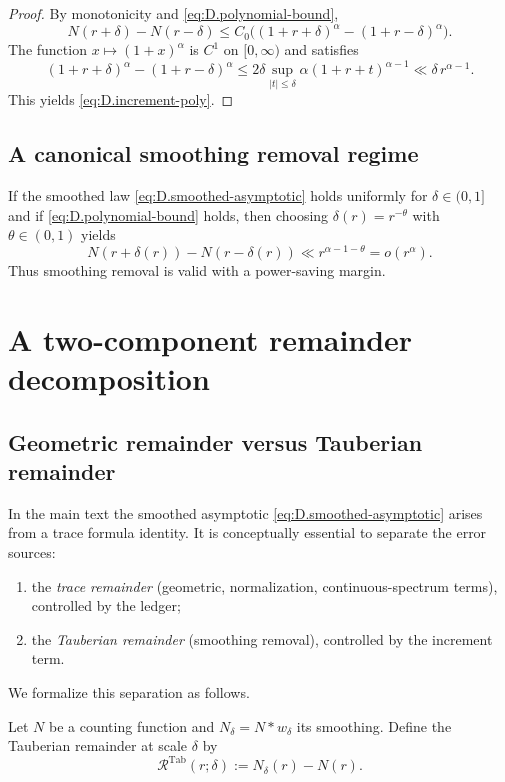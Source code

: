 \begin{proof}
By monotonicity and \eqref{eq:D.polynomial-bound},
\[
N(r+\delta)-N(r-\delta)
\le
C_0\bigl((1+r+\delta)^\alpha-(1+r-\delta)^\alpha\bigr).
\]
The function $x\mapsto (1+x)^\alpha$ is $C^1$ on $[0,\infty)$ and satisfies
\[
(1+r+\delta)^\alpha-(1+r-\delta)^\alpha
\le
2\delta \sup_{|t|\le \delta} \alpha(1+r+t)^{\alpha-1}
\ll
\delta\,r^{\alpha-1}.
\]
This yields \eqref{eq:D.increment-poly}.
\end{proof}

\subsection{A canonical smoothing removal regime}
\label{subsec:D.canonical-regime}

If the smoothed law \eqref{eq:D.smoothed-asymptotic} holds uniformly for $\delta\in(0,1]$ and if
\eqref{eq:D.polynomial-bound} holds, then choosing $\delta(r)=r^{-\theta}$ with $\theta\in(0,1)$ yields
\[
N(r+\delta(r))-N(r-\delta(r))
\ll
r^{\alpha-1-\theta}
=
o(r^\alpha).
\]
Thus smoothing removal is valid with a power-saving margin.

\section{A two-component remainder decomposition}
\label{sec:D.two-component}

\subsection{Geometric remainder versus Tauberian remainder}
\label{subsec:D.geometric-vs-tauberian}

In the main text the smoothed asymptotic \eqref{eq:D.smoothed-asymptotic} arises from a trace formula identity.
It is conceptually essential to separate the error sources:

\begin{enumerate}
\item the \emph{trace remainder} (geometric, normalization, continuous-spectrum terms), controlled by the ledger;
\item the \emph{Tauberian remainder} (smoothing removal), controlled by the increment term.
\end{enumerate}

We formalize this separation as follows.

\begin{definition}
\label{def:D.tauberian-remainder}
Let $N$ be a counting function and $N_\delta=N*w_\delta$ its smoothing.
Define the Tauberian remainder at scale $\delta$ by
\begin{equation}
\label{eq:D.tauberian-remainder}
\mathcal{R}^{\mathrm{Tab}}(r;\delta)
:=
N_\delta(r)-N(r).
\end{equation}
\end{definition}

